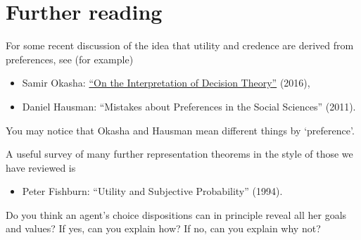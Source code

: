 \section{Further reading}

For some recent discussion of the idea that utility and credence are
derived from preferences, see (for example)

\begin{itemize}
\item Samir Okasha: \href{https://research-information.bristol.ac.uk/files/70387986/On_Interpretation_Decision_TheoryECONPHILrevised.pdf}{``On the Interpretation of Decision Theory''} (2016),
\item Daniel Hausman: ``Mistakes about Preferences in the Social
  Sciences'' (2011).
\end{itemize}
You may notice that Okasha and Hausman mean different things by
`preference'.

A useful survey of many further representation theorems in the style
of those we have reviewed is
\begin{itemize}
\item Peter Fishburn: ``Utility and Subjective Probability'' (1994).
\end{itemize}

\begin{essay}
  Do you think an agent's choice dispositions can in principle reveal
  all her goals and values? If yes, can you explain how? If no, can
  you explain why not?
\end{essay}



